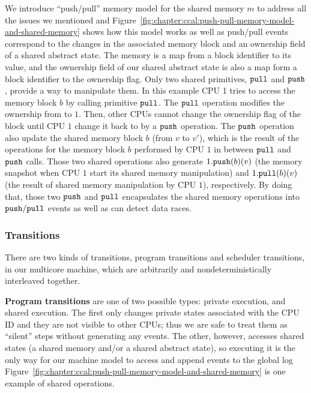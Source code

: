 We introduce ``push/pull'' memory model for the shared memory $m$ to address all the issues we mentioned and 
Figure~\ref{fig:chapter:ccal:push-pull-memory-model-and-shared-memory} shows 
how this model works as well as push/pull events correspond to the changes in the associated memory block and an ownership field of a shared abstract state.
The memory is a map from a block identifier to its value,
and the ownership field of our shared abstract state is also a map form a block identifier to the ownership flag.
Only two shared primitives, ${\mathrm{\texttt{pull}}}$ and ${\mathrm{\texttt{push}}}$,
provide a way to manipulate them.
In this example CPU 1 tries to access the memory block $b$ by calling primitive ${\mathrm{\texttt{pull}}}$. 
The ${\mathrm{\texttt{pull}}}$ operation modifies the ownership from  to  $1$. 
Then, other CPUs cannot change the ownership flag of the block until CPU $1$ change it back to  
by a ${\mathrm{\texttt{push}}}$ operation.
The ${\mathrm{\texttt{push}}}$ operation also update the shared memory block $b$ (from $v$ to $v'$), which is the result of the operations for the memory block $b$ performed by CPU $1$ in between ${\mathrm{\texttt{pull}}}$ and ${\mathrm{\texttt{push}}}$ calls. 
Those two shared operations also generate $1.{\mathrm{\texttt{push}}}(b)(v)$ (the memory snapshot when CPU $1$ start its shared memory manipulation) 
and  $1.{\mathrm{\texttt{pull}}}(b)(v)$ (the result of shared memory manipulation by CPU $1$), respectively.
By doing that, those two ${\mathrm{\texttt{push}}}$ and ${\mathrm{\texttt{pull}}}$ encapsulates the shared memory operations
into ${\mathrm{\texttt{push}}}/{\mathrm{\texttt{pull}}}$ events as well as can detect data races.

\subsubsection{Transitions}

There are two kinds of transitions, program transitions and scheduler transitions, in our multicore machine,
which are arbitrarily and nondeterministically interleaved together.


\textbf{Program transitions} are one of two possible types:
private execution, and shared execution.
The first only changes private states associated with the CPU ID and 
they are not visible to other CPUs;
thus we are safe to treat them as ``silent'' steps without generating any events. 
The other, however, 
accesses shared states (a shared memory and/or a shared abstract state),
so executing it is  the only way for our machine model  to access and append events to the global log 
Figure~\ref{fig:chapter:ccal:push-pull-memory-model-and-shared-memory} is one example of shared operations.

